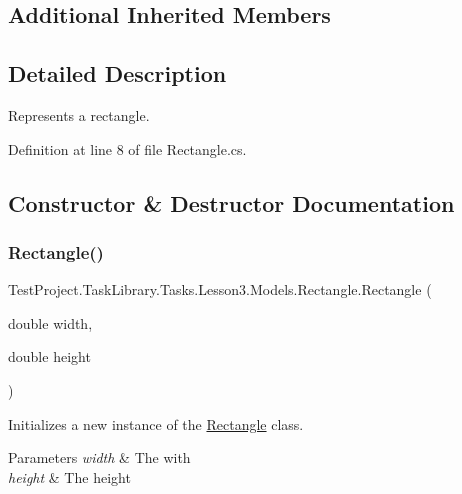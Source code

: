 \subsection*{Additional Inherited Members}


\subsection{Detailed Description}
Represents a rectangle. 



Definition at line 8 of file Rectangle.\+cs.



\subsection{Constructor \& Destructor Documentation}
\mbox{\label{class_test_project_1_1_task_library_1_1_tasks_1_1_lesson3_1_1_models_1_1_rectangle_a9be55aba1ef3264c6dfe6c796d576c35}} 
\subsubsection{\texorpdfstring{Rectangle()}{Rectangle()}}
{\footnotesize\ttfamily Test\+Project.\+Task\+Library.\+Tasks.\+Lesson3.\+Models.\+Rectangle.\+Rectangle (\begin{DoxyParamCaption}\item[{double}]{width,  }\item[{double}]{height }\end{DoxyParamCaption})}



Initializes a new instance of the \mbox{\hyperlink{class_test_project_1_1_task_library_1_1_tasks_1_1_lesson3_1_1_models_1_1_rectangle}{Rectangle}} class. 


\begin{DoxyParams}{Parameters}
{\em width} & The with\\
\hline
{\em height} & The height\\
\hline
\end{DoxyParams}


